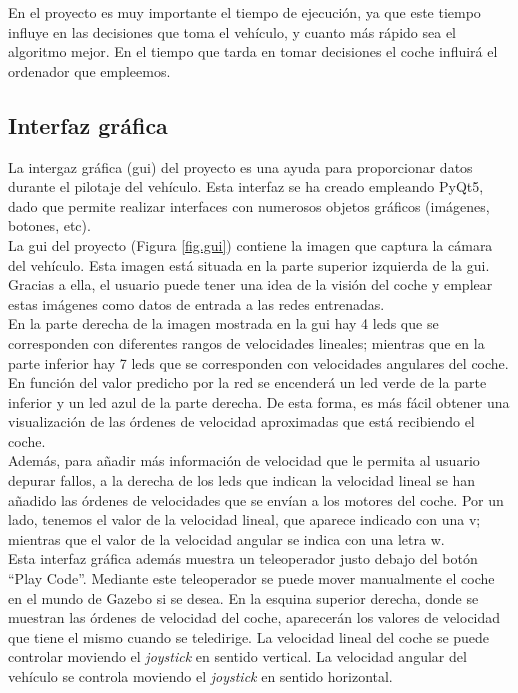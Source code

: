 En el proyecto es muy importante el tiempo de ejecución, ya que este tiempo influye en las decisiones que toma el vehículo, y cuanto más rápido sea el algoritmo mejor. En el tiempo que tarda en tomar decisiones el coche influirá el ordenador que empleemos. \\


\subsection{Interfaz gráfica}

La intergaz gráfica (\acrshort{gui}) del proyecto es una ayuda para proporcionar datos durante el pilotaje del vehículo. Esta interfaz se ha creado empleando PyQt5, dado que permite realizar interfaces con numerosos objetos gráficos (imágenes, botones, etc).\\

La \acrshort{gui} del proyecto (Figura \ref{fig.gui}) contiene la imagen que captura la cámara del vehículo. Esta imagen está situada en la parte superior izquierda de la \acrshort{gui}. Gracias a ella, el usuario puede tener una idea de la visión del coche y emplear estas imágenes como datos de entrada a las redes entrenadas.\\

En la parte derecha de la imagen mostrada en la \acrshort{gui} hay 4 leds que se corresponden con diferentes rangos de velocidades lineales; mientras que en la parte inferior hay 7 leds que se corresponden con velocidades angulares del coche. En función del valor predicho por la red se encenderá un led verde de la parte inferior y un led azul de la parte derecha. De esta forma, es más fácil obtener una visualización de las órdenes de velocidad aproximadas que está recibiendo el coche. \\

Además, para añadir más información de velocidad que le permita al usuario depurar fallos, a la derecha de los leds que indican la velocidad lineal se han añadido las órdenes de velocidades que se envían a los motores del coche. Por un lado, tenemos el valor de la velocidad lineal, que aparece indicado con una v; mientras que el valor de la velocidad angular se indica con una letra w.\\

Esta interfaz gráfica además muestra un teleoperador justo debajo del botón ``Play Code''. Mediante este teleoperador se puede mover manualmente el coche en el mundo de Gazebo si se desea. En la esquina superior derecha, donde se muestran las órdenes de velocidad del coche, aparecerán los valores de velocidad que tiene el mismo cuando se teledirige. La velocidad lineal del coche se puede controlar moviendo el \textit{joystick} en sentido vertical. La velocidad angular del vehículo se controla moviendo el \textit{joystick} en sentido horizontal.\\


